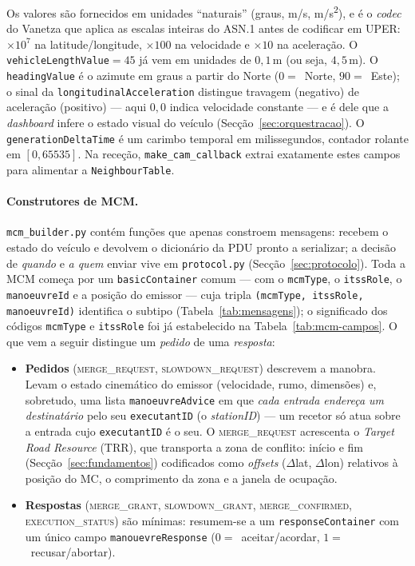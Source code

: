 \documentclass[11pt,a4paper]{article}
\begin{document}
Os valores são fornecidos em unidades ``naturais'' (graus, m/s, m/s\textsuperscript{2}), e é
o \emph{codec} do Vanetza que aplica as escalas inteiras do ASN.1 antes de codificar em
UPER: $\times 10^{7}$ na latitude/longitude, $\times 100$ na velocidade e $\times 10$ na
aceleração. O \texttt{vehicleLengthValue}$=45$ já vem em unidades de $0{,}1$\,m (ou seja,
$4{,}5$\,m). O \texttt{headingValue} é o azimute em graus a partir do Norte ($0=$~Norte,
$90=$~Este); o sinal da \texttt{longitudinalAcceleration} distingue travagem (negativo) de
aceleração (positivo) --- aqui $0{,}0$ indica velocidade constante --- e é dele que a
\emph{dashboard} infere o estado visual do veículo (Secção~\ref{sec:orquestracao}). O
\texttt{generationDeltaTime} é um carimbo temporal em milissegundos, contador rolante em
$[0,65535]$. Na receção, \texttt{make\_cam\_callback} extrai exatamente estes campos para
alimentar a \texttt{NeighbourTable}.

\paragraph{Construtores de MCM.} \texttt{mcm\_builder.py} contém funções que apenas
constroem mensagens: recebem o estado do veículo e devolvem o dicionário da PDU pronto a
serializar; a decisão de \emph{quando} e \emph{a quem} enviar vive em \texttt{protocol.py}
(Secção~\ref{sec:protocolo}). Toda a MCM começa por um \texttt{basicContainer} comum --- com
o \texttt{mcmType}, o \texttt{itssRole}, o \texttt{manoeuvreId} e a posição do emissor ---
cuja tripla \texttt{(mcmType, itssRole, manoeuvreId)} identifica o subtipo
(Tabela~\ref{tab:mensagens}); o significado dos códigos \texttt{mcmType} e \texttt{itssRole}
foi já estabelecido na Tabela~\ref{tab:mcm-campos}. O que vem a seguir distingue um
\emph{pedido} de uma \emph{resposta}:

\begin{itemize}[noitemsep,topsep=2pt]
  \item \textbf{Pedidos} (\textsc{merge\_request}, \textsc{slowdown\_request}) descrevem a
        manobra. Levam o estado cinemático do emissor (velocidade, rumo, dimensões) e,
        sobretudo, uma lista \texttt{manoeuvreAdvice} em que \emph{cada entrada endereça um
        destinatário} pelo seu \texttt{executantID} (o \emph{stationID}) ---
        um recetor só atua sobre a entrada cujo \texttt{executantID} é o seu.
        O \textsc{merge\_request} acrescenta o \emph{Target Road Resource} (TRR), que
        transporta a zona de conflito: início e fim (Secção~\ref{sec:fundamentos})
        codificados como \emph{offsets} ($\Delta$lat, $\Delta$lon) relativos à posição do MC,
        o comprimento da zona e a janela de ocupação.
  \item \textbf{Respostas} (\textsc{merge\_grant}, \textsc{slowdown\_grant},
        \textsc{merge\_confirmed}, \textsc{execution\_status}) são mínimas: resumem-se a um
        \texttt{responseContainer} com um único campo \texttt{manouevreResponse}
        ($0=$~aceitar/acordar, $1=$~recusar/abortar).
\end{itemize}
\end{document}

